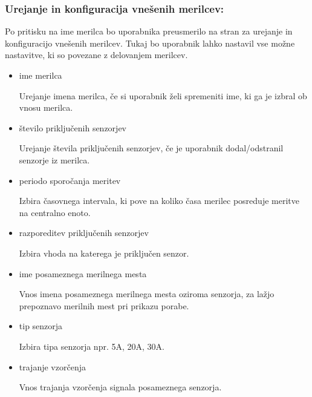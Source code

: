 \documentclass[12pt,a4paper,titlepage,openany]{report}
\begin{document}
\subsubsection{Urejanje in konfiguracija vnešenih merilcev:}
Po pritisku na ime merilca bo uporabnika preusmerilo na stran za urejanje in konfiguracijo vnešenih merilcev. Tukaj bo uporabnik lahko nastavil vse možne nastavitve, ki so povezane z delovanjem merilcev.

\begin{itemize}
\item ime merilca
\begin{flushleft}
Urejanje imena merilca, če si uporabnik želi spremeniti ime, ki ga je izbral ob vnosu merilca.
\end{flushleft}
\item število priključenih senzorjev
\begin{flushleft}
Urejanje števila priključenih senzorjev, če je uporabnik dodal/odstranil senzorje iz merilca.
\end{flushleft}
\item periodo sporočanja meritev
\begin{flushleft}
Izbira časovnega intervala, ki pove na koliko časa merilec posreduje meritve na centralno enoto.
\end{flushleft}
\item razporeditev priključenih senzorjev
\begin{flushleft}
Izbira vhoda na katerega je priključen senzor.
\end{flushleft}
\item ime posameznega merilnega mesta
\begin{flushleft}
Vnos imena posameznega merilnega mesta oziroma senzorja, za lažjo prepoznavo merilnih mest pri prikazu porabe.
\end{flushleft}
\item tip senzorja
\begin{flushleft}
Izbira tipa senzorja npr. 5A, 20A, 30A.
\end{flushleft}
\item trajanje vzorčenja
\begin{flushleft}
Vnos trajanja vzorčenja signala posameznega senzorja.
\end{flushleft}
\end{itemize}
\end{document}
